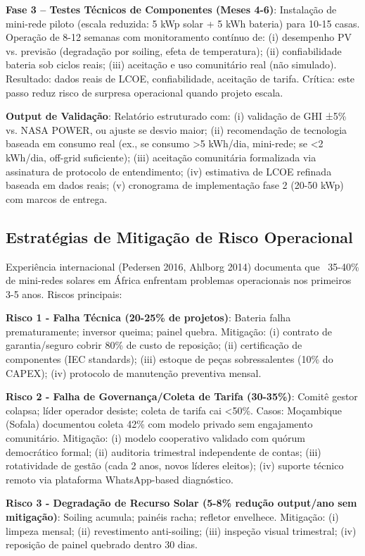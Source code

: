\documentclass[12pt, a4paper]{article}
\begin{document}
\textbf{Fase 3 – Testes Técnicos de Componentes (Meses 4-6)}: Instalação de mini-rede piloto (escala reduzida: 5 kWp solar + 5 kWh bateria) para 10-15 casas. Operação de 8-12 semanas com monitoramento contínuo de: (i) desempenho PV vs. previsão (degradação por soiling, efeta de temperatura); (ii) confiabilidade bateria sob ciclos reais; (iii) aceitação e uso comunitário real (não simulado). Resultado: dados reais de LCOE, confiabilidade, aceitação de tarifa. Crítica: este passo reduz risco de surpresa operacional quando projeto escala.

\textbf{Output de Validação}: Relatório estruturado com: (i) validação de GHI ±5\% vs. NASA POWER, ou ajuste se desvio maior; (ii) recomendação de tecnologia baseada em consumo real (ex., se consumo >5 kWh/dia, mini-rede; se <2 kWh/dia, off-grid suficiente); (iii) aceitação comunitária formalizada via assinatura de protocolo de entendimento; (iv) estimativa de LCOE refinada baseada em dados reais; (v) cronograma de implementação fase 2 (20-50 kWp) com marcos de entrega.

\subsection{Estratégias de Mitigação de Risco Operacional}

Experiência internacional (Pedersen 2016, Ahlborg 2014) documenta que ~35-40\% de mini-redes solares em África enfrentam problemas operacionais nos primeiros 3-5 anos. Riscos principais:

\textbf{Risco 1 - Falha Técnica (20-25\% de projetos)}: Bateria falha prematuramente; inversor queima; painel quebra. Mitigação: (i) contrato de garantia/seguro cobrir 80\% de custo de reposição; (ii) certificação de componentes (IEC standards); (iii) estoque de peças sobressalentes (10\% do CAPEX); (iv) protocolo de manutenção preventiva mensal.

\textbf{Risco 2 - Falha de Governança/Coleta de Tarifa (30-35\%)}: Comitê gestor colapsa; líder operador desiste; coleta de tarifa cai <50\%. Casos: Moçambique (Sofala) documentou coleta 42\% com modelo privado sem engajamento comunitário. Mitigação: (i) modelo cooperativo validado com quórum democrático formal; (ii) auditoria trimestral independente de contas; (iii) rotatividade de gestão (cada 2 anos, novos líderes eleitos); (iv) suporte técnico remoto via plataforma WhatsApp-based diagnóstico.

\textbf{Risco 3 - Degradação de Recurso Solar (5-8\% redução output/ano sem mitigação)}: Soiling acumula; painéis racha; refletor envelhece. Mitigação: (i) limpeza mensal; (ii) revestimento anti-soiling; (iii) inspeção visual trimestral; (iv) reposição de painel quebrado dentro 30 dias.
\end{document}
